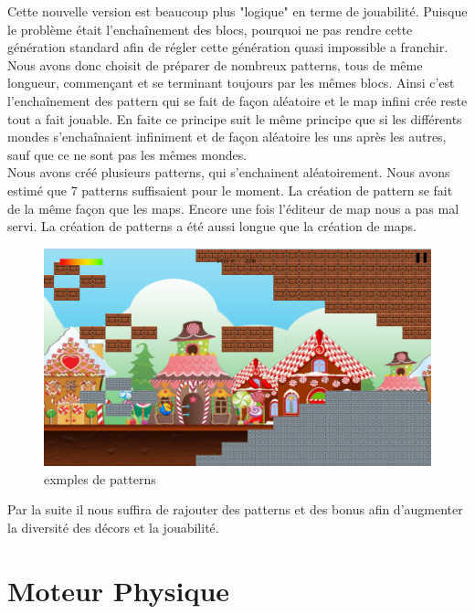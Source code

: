 \documentclass [11pt]{report}
\begin{document}
						
			Cette nouvelle version est beaucoup plus "logique" en terme de jouabilité. Puisque le problème était l’enchaînement des blocs, pourquoi ne pas rendre cette génération standard afin de régler cette génération quasi impossible a franchir. Nous avons donc choisit de préparer de nombreux patterns, tous de même longueur, commençant et se terminant toujours par les mêmes blocs. Ainsi c'est l’enchaînement des pattern qui se fait de façon aléatoire et le map infini crée reste tout a fait jouable. En faite ce principe suit le même principe que si les différents mondes s’enchaînaient infiniment et de façon aléatoire les uns après les autres, sauf que ce ne sont pas les mêmes mondes.\\
			
			Nous avons créé plusieurs patterns, qui s'enchainent aléatoirement. Nous avons estimé que 7 patterns suffisaient pour le moment. La création de pattern se fait de la même façon que les maps. Encore une fois l'éditeur de map nous a pas mal servi. La création de patterns a \'et\'e aussi longue que la création de maps.\\
			
			
			\begin{figure}[h]
				\centering
				\includegraphics[width=0.7\linewidth]{images/pattern.png}
				\caption[Editeur de Maps]{exmples de patterns}	
				\label{fig:Pattern}
			\end{figure}
						
			Par la suite il nous suffira de rajouter des patterns et des bonus afin d'augmenter la diversité des décors et la jouabilité.
			
			\vspace{10mm}
			
\newpage
	\section{Moteur Physique}
	
		\vspace{5mm}
	
\end{document}
